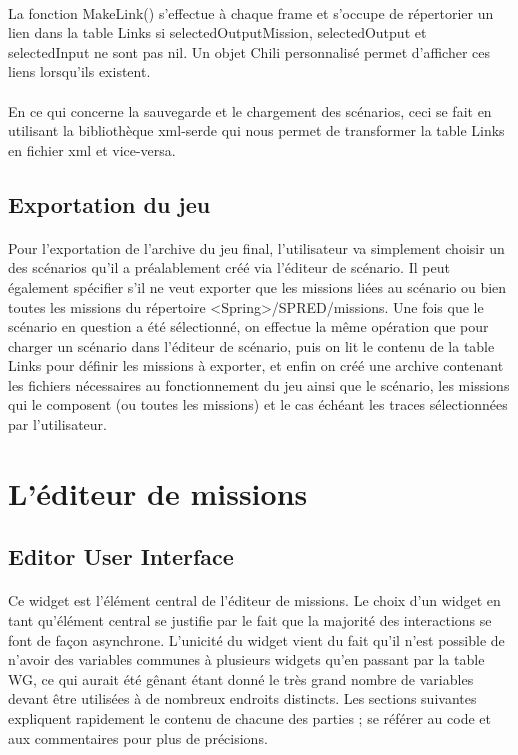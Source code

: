 \documentclass[a4paper]{article}
\begin{document}
\paragraph{}
La fonction MakeLink() s'effectue à chaque frame et s'occupe de répertorier un lien dans la table Links si selectedOutputMission, selectedOutput et selectedInput ne sont pas nil. Un objet Chili personnalisé permet d'afficher ces liens lorsqu'ils existent.
\paragraph{}
En ce qui concerne la sauvegarde et le chargement des scénarios, ceci se fait en utilisant la bibliothèque xml-serde qui nous permet de transformer la table Links en fichier xml et vice-versa.
\subsection{Exportation du jeu}
\paragraph{}
Pour l'exportation de l'archive du jeu final, l'utilisateur va simplement choisir un des scénarios qu'il a préalablement créé via l'éditeur de scénario. Il peut également spécifier s'il ne veut exporter que les missions liées au scénario ou bien toutes les missions du répertoire <Spring>/SPRED/missions. Une fois que le scénario en question a été sélectionné, on effectue la même opération que pour charger un scénario dans l'éditeur de scénario, puis on lit le contenu de la table Links pour définir les missions à exporter, et enfin on créé une archive contenant les fichiers nécessaires au fonctionnement du jeu ainsi que le scénario, les missions qui le composent (ou toutes les missions) et le cas échéant les traces sélectionnées par l'utilisateur.
\section{L'éditeur de missions}
\subsection{Editor User Interface}
\paragraph{}
Ce widget est l'élément central de l'éditeur de missions. Le choix d'un widget en tant qu'élément central se justifie par le fait que la majorité des interactions se font de façon asynchrone. L'unicité du widget vient du fait qu'il n'est possible de n'avoir des variables communes à plusieurs widgets qu'en passant par la table WG, ce qui aurait été gênant étant donné le très grand nombre de variables devant être utilisées à de nombreux endroits distincts. Les sections suivantes expliquent rapidement le contenu de chacune des parties ; se référer au code et aux commentaires pour plus de précisions.
\end{document}

